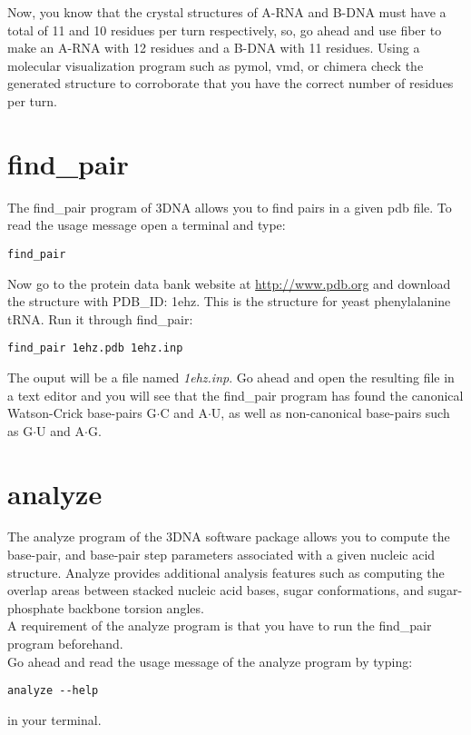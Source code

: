 \noindent Now, you know that the crystal structures of A-RNA and B-DNA
must have a total of 11  and 10 residues per turn respectively, so, go
ahead and use  \textrm{fiber} to make an A-RNA with  12 residues and a
B-DNA with 11 residues.   Using a molecular visualization program such
as pymol, vmd, or chimera check the generated structure to corroborate
that you have the correct number of residues per turn.

\section{find\_pair}
The \textrm{find\_pair} program of 3DNA  allows you to find pairs in a
given pdb file.
To read the usage message open a terminal and type:
\begin{Verbatim}
find_pair
\end{Verbatim} 
Now go  to the protein data bank website  at \url{http://www.pdb.org}
and download the  structure with PDB\_ID: 1ehz. This  is the structure
for yeast phenylalanine tRNA. 
Run it through \textrm{find\_pair}:
\begin{Verbatim}
find_pair 1ehz.pdb 1ehz.inp
\end{Verbatim}
The ouput  will be a file  named \textit{1ehz.inp}. Go  ahead and open
the  resulting  file in  a  text  editor and  you  will  see that  the
\textrm{find\_pair}  program  has  found  the  canonical  Watson-Crick
base-pairs   G$\cdot$C  and  A$\cdot$U,   as  well   as  non-canonical
base-pairs such as G$\cdot$U and A$\cdot$G.

\section{analyze}
The \textrm{analyze}  program of the 3DNA software  package allows you
to  compute the  base-pair, and  base-pair step  parameters associated
with a  given nucleic acid structure. Analyze  provides additional analysis
features such as computing the overlap areas between stacked nucleic acid
bases,  sugar  conformations,  and  sugar-phosphate  backbone  torsion
angles.\\ 
A  requirement of the  \textrm{analyze} program is  that you
have to run the \textrm{find\_pair} program beforehand.\\ 
Go ahead and read the usage message of the analyze program by typing:
\begin{Verbatim}
analyze --help
\end{Verbatim}
in your terminal.\\

